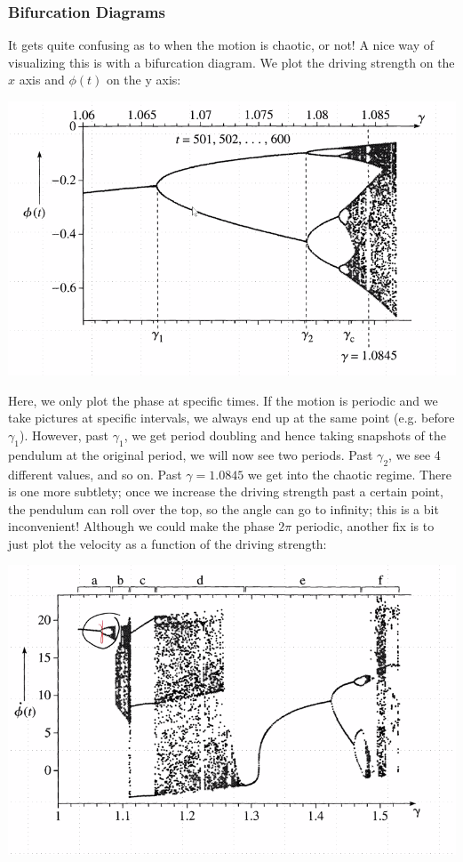 \documentclass[../PHYS306Notes.tex]{subfiles}
\begin{document}
\subsubsection{Bifurcation Diagrams}
It gets quite confusing as to when the motion is chaotic, or not! A nice way of visualizing this is with a bifurcation diagram. We plot the driving strength on the $x$ axis and $\phi(t)$ on the y axis:
\begin{center}
    \includegraphics[scale=0.6]{Lecture-33/l33-img9.png}
\end{center}
Here, we only plot the phase at specific times. If the motion is periodic and we take pictures at specific intervals, we always end up at the same point (e.g. before $\gamma_1$). However, past $\gamma_1$, we get period doubling and hence taking snapshots of the pendulum at the original period, we will now see two periods. Past $\gamma_2$, we see 4 different values, and so on. Past $\gamma = 1.0845$ we get into the chaotic regime. There is one more subtlety; once we increase the driving strength past a certain point, the pendulum can roll over the top, so the angle can go to infinity; this is a bit inconvenient! Although we could make the phase $2\pi$ periodic, another fix is to just plot the velocity as  a function of the driving strength:
\begin{center}
    \includegraphics[scale=0.6]{Lecture-33/l33-img10.png}
\end{center}
\end{document}
